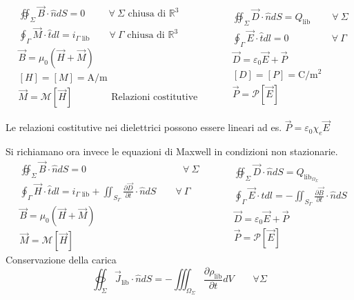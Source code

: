 $$
\begin{aligned}
&\oiint_{\Sigma} \vec{B}\cdot\hat{n}dS = 0 \qquad\ \ \forall \ \Sigma \text{ chiusa di } \mathbb{R}^3\\
&\oint_\Gamma \vec{M}\cdot\hat{t}dl = i_{\Gamma\text{ lib}} \qquad \forall \ \Gamma \text{ chiusa di } \mathbb{R}^3\\
&\vec{B} = \mu_0(\vec{H} + \vec{M}) \\
&[H] = [M] = \si{\ampere\per\meter} \\
& \vec{M} = \mathcal{M}[\vec{H}] \qquad\qquad \text{Relazioni costitutive}
\end{aligned}
\qquad
\begin{aligned}
&\oiint_\Sigma \vec{D}\cdot\hat{n} dS = Q_{\text{lib}} \ \qquad \forall \ \Sigma \\
&\oint_\Gamma\vec{E}\cdot\hat{t} dl = 0 \ \qquad\qquad\ \forall \ \Gamma \\
&\vec{D} = \varepsilon_0\vec{E} + \vec{P}\\
&[D] = [P] = \si{\coulomb\per\meter^2}\\
&\vec{P} =\mathcal{P}[\vec{E}]
\end{aligned}
$$

Le relazioni costitutive nei dielettrici possono essere lineari ad es. $\vec{P} = \varepsilon_0\chi_e\vec{E} $

Si richiamano ora invece le equazioni di Maxwell in condizioni non stazionarie.
$$
\begin{aligned}
&\oiint_\Sigma \vec{B}\cdot\hat{n} dS = 0 \qquad\qquad\qquad\qquad\qquad \forall\ \Sigma\\
&\oint_\Gamma \vec{H}\cdot\hat{t}dl = i_{\Gamma \text{ lib}} + \iint_{S_\Gamma} \frac{\partial \vec{D}}{\partial t} \cdot\hat{n} dS\qquad \forall \ \Gamma\\
&\vec{B} = \mu_0(\vec{H} + \vec{M}) \\
& \vec{M} = \mathcal{M}[\vec{H}] 
\end{aligned}
\qquad
\begin{aligned}
&\oiint_\Sigma \vec{D}\cdot\hat{n}dS = Q_{\text{lib}_{\Omega_\Sigma}}\\
&\oint_\Gamma \vec{E}\cdot\hat{t}dl = -\iint_{S_\Gamma} \frac{\partial\vec{B}}{\partial t}\cdot\hat{n}dS\\
&\vec{D} = \varepsilon_0\vec{E} + \vec{P}\\
&\vec{P} =\mathcal{P}[\vec{E}]
\end{aligned}
$$
Conservazione della carica
$$
\oiint_\Sigma \vec{J}_{\text{lib}}\cdot\hat{n}dS = - \iiint_{\Omega_\Sigma}\frac{\partial \rho_\text{lib}}{\partial t} dV \qquad \forall \Sigma
$$

